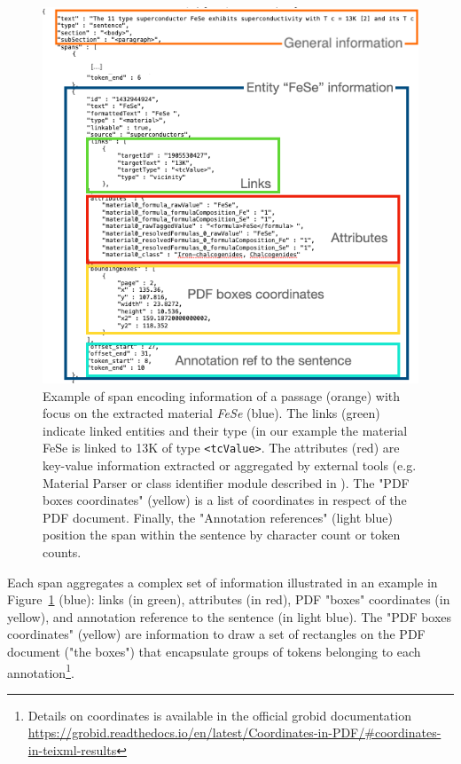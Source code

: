 \begin{figure}[htbp]
  \centering
  \includegraphics[width=1\textwidth]{images/data-flow-2} 
  \caption{Example of span encoding information of a passage (orange) with focus on the extracted material \textit{FeSe} (blue). 
  The links (green) indicate linked entities and their type (in our example the material FeSe is linked to 13K of type \texttt{<tcValue>}. 
  The attributes (red) are key-value information extracted or aggregated by external tools (e.g. Material Parser or class identifier module described in \cite{lfoppiano2023automatic}).
  The "PDF boxes coordinates" (yellow) is a list of coordinates in respect of the PDF document. 
  Finally, the "Annotation references" (light blue) position the span within the sentence by character count or token counts.}
  \label{fig:data-flow-2}
\end{figure}

Each span aggregates a complex set of information illustrated in an example in Figure~\ref{fig:data-flow-2} (blue): links (in green), attributes (in red), PDF "boxes" coordinates (in yellow), and annotation reference to the sentence (in light blue). 
The "PDF boxes coordinates" (yellow) are information to draw a set of rectangles on the PDF document ("the boxes") that encapsulate groups of tokens belonging to each annotation\footnote{Details on coordinates is available in the official grobid documentation \url{https://grobid.readthedocs.io/en/latest/Coordinates-in-PDF/\#coordinates-in-teixml-results}}.

